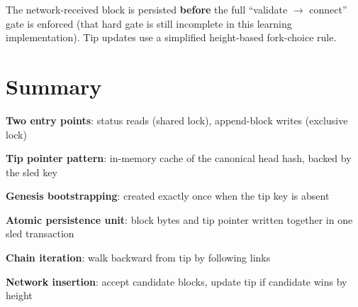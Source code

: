 \begin{notebox}
The network-received block is persisted \textbf{before} the full ``validate \(\to\) connect'' gate is enforced (that hard gate is still incomplete in this learning implementation). Tip updates use a simplified height-based fork-choice rule.
\end{notebox}

\section{Summary}
\label{sec:ch09-3-summary}

\begin{chaptersummary}
\item \textbf{Two entry points}: status reads (shared lock), append-block writes (exclusive lock)
\item \textbf{Tip pointer pattern}: in-memory cache of the canonical head hash, backed by the sled key 
\item \textbf{Genesis bootstrapping}: created exactly once when the tip key is absent
\item \textbf{Atomic persistence unit}: block bytes and tip pointer written together in one sled transaction
\item \textbf{Chain iteration}: walk backward from tip by following  links
\item \textbf{Network insertion}: accept candidate blocks, update tip if candidate wins by height
\end{chaptersummary}
